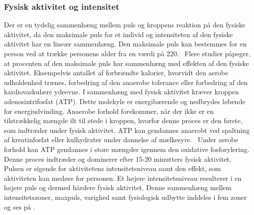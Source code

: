 \subsubsection{Fysisk aktivitet og intensitet}\label{subsub:ak_int}
Der er en tydelig sammenhæng mellem puls og kroppens reaktion på den fysiske aktivitet, da den maksimale puls for et individ og intensiteten af den fysiske aktivitet har en lineær sammenhæng. Den maksimale puls kan bestemmes for en person ved at trække personens alder fra en værdi på 220.~\citep{CooperBlair2005}\newline
Flere studier påpeger, at procenten af den maksimale puls har sammenhæng med effekten af den fysiske aktivitet. Eksempelvis antallet af forbrændte kalorier, hvorvidt den aerobe udholdenhed trænes, forbedring af den anaerobe tolerance eller forbedring af den kardiovaskulære ydeevne. I sammenhæng med fysisk aktivitet kræver kroppen adenosintrifosfat (ATP). Dette molekyle er energibærende og nedbrydes løbende for energiudvinding. Anaerobe forhold forekommer, når der ikke er en tilstrækkelig mængde ilt til stede i kroppen, hvorfor denne proces er den første, som indtræder under fysisk aktivitet. ATP kan gendannes anaerobt ved spaltning af kreatinfosfat eller kulhydrater under dannelse af mælkesyre.~\citep{Martini2012,Academic2016c,Engelbreth2010} Under aerobe forhold kan ATP gendannes i store mængder igennem den oxidative fosforylering. Denne proces indtræder og dominerer efter 15-20 minutters fysisk aktivitet.~\citep{Martini2012,Engelbreth2010} \newline
Pulsen er sigende for aktivitetens intensitetsniveau samt den effekt, som aktiviteten kan medøre for personen. Et højere intensitetsniveau resulterer i en højere puls og dermed hårdere fysisk aktivitet. Denne sammenhæng mellem intensitetszoner, maxpuls, varighed samt fysiologisk udbytte inddeles i fem zoner og ses på .~\citep{Leyland2007,Heartratejournal2015}
